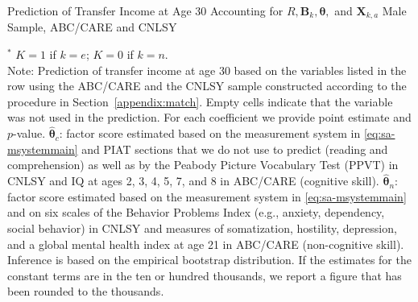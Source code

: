\begin{table}
\begin{threeparttable}
\caption{Prediction of Transfer Income at Age 30 Accounting for $R, \bm{B}_k, \bm{\theta},$ and $\bm{X}_{k,a}$ Male Sample, ABC/CARE and CNLSY}
\centering
\scriptsize

\begin{tablenotes}
\footnotesize
\item $^\ast$ $K=1$ if $k=e$; $K=0$ if $k=n$.\\ 
Note: Prediction of transfer income at age 30 based on the variables listed in the row using the ABC/CARE and the CNLSY sample constructed according to the procedure in Section~\ref{appendix:match}. Empty cells indicate that the variable was not used in the prediction. For each coefficient we provide point estimate and $p$-value. $\hat{\bm{\theta}}_{c}$: factor score estimated based on the measurement system in \eqref{eq:sa-msystemmain} and PIAT sections that we do not use to predict (reading and comprehension) as well as by the Peabody Picture Vocabulary Test (PPVT) in CNLSY and IQ at ages 2, 3, 4, 5, 7, and 8 in ABC/CARE (cognitive skill). $\hat{\bm{\theta}}_{n}$: factor score estimated based on the measurement system in \eqref{eq:sa-msystemmain} and on six scales of the Behavior Problems Index (e.g., anxiety, dependency, social behavior) in CNLSY and measures of somatization, hostility, depression, and a global mental health index at age 21 in ABC/CARE (non-cognitive skill). Inference is based on the empirical bootstrap distribution. If the estimates for the constant terms are in the ten or hundred thousands, we report a figure that has been rounded to the thousands.
\end{tablenotes}
\end{threeparttable}
\end{table}

